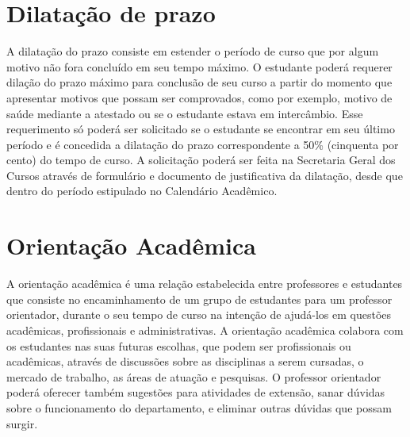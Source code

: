 \section{Dilatação de prazo}

A dilatação do prazo consiste em estender o período de curso que por algum motivo não fora concluído em seu tempo máximo. O estudante poderá requerer dilação do prazo máximo para conclusão de seu curso a partir do momento que apresentar motivos que possam ser comprovados, como por exemplo, motivo de saúde mediante a atestado ou se o estudante estava em intercâmbio. Esse requerimento só poderá ser solicitado se o estudante se encontrar em seu último período e é concedida a dilatação do prazo correspondente a 50\% (cinquenta por cento) do tempo de curso. A solicitação poderá ser feita na Secretaria Geral dos Cursos através de formulário e documento de justificativa da dilatação, desde que dentro do período estipulado no Calendário Acadêmico.

\section{Orientação Acadêmica}

A orientação acadêmica é uma relação estabelecida entre professores e estudantes que consiste no encaminhamento  de um grupo de estudantes para um professor orientador, durante o seu tempo de curso na intenção de ajudá-los em questões acadêmicas, profissionais e administrativas. A orientação acadêmica colabora com os estudantes nas suas futuras escolhas, que podem ser profissionais ou acadêmicas, através de discussões sobre as disciplinas a serem cursadas, o mercado de trabalho, as áreas de atuação e pesquisas. O professor orientador poderá oferecer também sugestões para atividades de extensão, sanar dúvidas sobre o funcionamento do departamento, e eliminar outras dúvidas que possam surgir.
